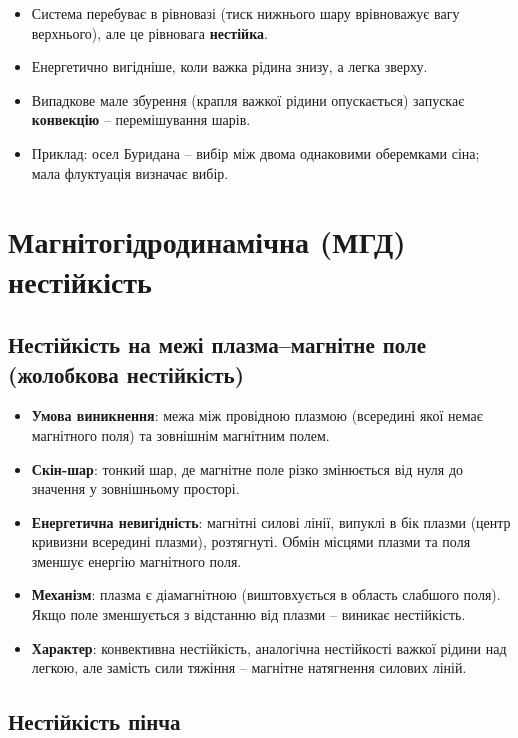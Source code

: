 \documentclass[a4paper,12pt]{article}
\begin{document}
\begin{itemize}
    \item Система перебуває в рівновазі (тиск нижнього шару врівноважує вагу верхнього), але це рівновага \textbf{нестійка}.
    \item Енергетично вигідніше, коли важка рідина знизу, а легка зверху.
    \item Випадкове мале збурення (крапля важкої рідини опускається) запускає \textbf{конвекцію} – перемішування шарів.
    \item Приклад: осел Буридана – вибір між двома однаковими оберемками сіна; мала флуктуація визначає вибір.
\end{itemize}

\section{Магнітогідродинамічна (МГД) нестійкість}

\subsection{Нестійкість на межі плазма–магнітне поле (жолобкова нестійкість)}

\begin{itemize}
    \item \textbf{Умова виникнення}: межа між провідною плазмою (всередині якої немає магнітного поля) та зовнішнім магнітним полем.
    \item \textbf{Скін-шар}: тонкий шар, де магнітне поле різко змінюється від нуля до значення у зовнішньому просторі.
    \item \textbf{Енергетична невигідність}: магнітні силові лінії, випуклі в бік плазми (центр кривизни всередині плазми), розтягнуті. Обмін місцями плазми та поля зменшує енергію магнітного поля.
    \item \textbf{Механізм}: плазма є діамагнітною (виштовхується в область слабшого поля). Якщо поле зменшується з відстанню від плазми – виникає нестійкість.
    \item \textbf{Характер}: конвективна нестійкість, аналогічна нестійкості важкої рідини над легкою, але замість сили тяжіння – магнітне натягнення силових ліній.
\end{itemize}

\subsection{Нестійкість пінча}
\end{document}
